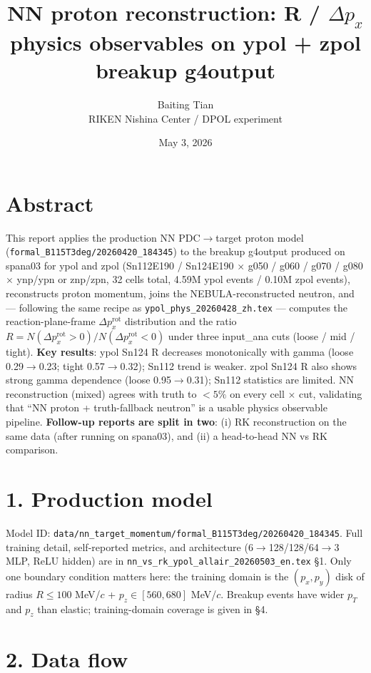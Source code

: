 \documentclass[a4paper,11pt]{article}
\title{\textbf{NN proton reconstruction: R / $\Delta p_x$ physics observables on ypol + zpol breakup g4output}}
\author{Baiting Tian \\ RIKEN Nishina Center / DPOL experiment}
\date{May 3, 2026}
\begin{document}
\maketitle

\section*{Abstract}
This report applies the production NN PDC$\to$target proton model (\texttt{formal\_B115T3deg/20260420\_184345}) to the breakup g4output produced on spana03 for ypol and zpol (Sn112E190 / Sn124E190 $\times$ g050 / g060 / g070 / g080 $\times$ ynp/ypn or znp/zpn, 32 cells total, 4.59M ypol events / 0.10M zpol events), reconstructs proton momentum, joins the NEBULA-reconstructed neutron, and --- following the same recipe as \texttt{ypol\_phys\_20260428\_zh.tex} --- computes the reaction-plane-frame $\Delta p_x^\text{rot}$ distribution and the ratio $R = N(\Delta p_x^\text{rot}>0)/N(\Delta p_x^\text{rot}<0)$ under three input\_ana cuts (loose / mid / tight).
\textbf{Key results}: ypol Sn124 R decreases monotonically with gamma (loose 0.29$\to$0.23; tight 0.57$\to$0.32); Sn112 trend is weaker. zpol Sn124 R also shows strong gamma dependence (loose 0.95$\to$0.31); Sn112 statistics are limited. NN reconstruction (mixed) agrees with truth to $<5\%$ on every cell $\times$ cut, validating that ``NN proton + truth-fallback neutron'' is a usable physics observable pipeline.
\textbf{Follow-up reports are split in two}: (i) RK reconstruction on the same data (after running on spana03), and (ii) a head-to-head NN vs RK comparison.

\section{1. Production model}

Model ID: \texttt{data/nn\_target\_momentum/formal\_B115T3deg/20260420\_184345}.
Full training detail, self-reported metrics, and architecture (6$\to$128/128/64$\to$3 MLP, ReLU hidden) are in \texttt{nn\_vs\_rk\_ypol\_allair\_20260503\_en.tex} \S1.
Only one boundary condition matters here: the training domain is the $(p_x, p_y)$ disk of radius $R \le 100$ MeV/$c$ + $p_z \in [560, 680]$ MeV/$c$. Breakup events have wider $p_T$ and $p_z$ than elastic; training-domain coverage is given in \S4.

\section{2. Data flow}
\end{document}
